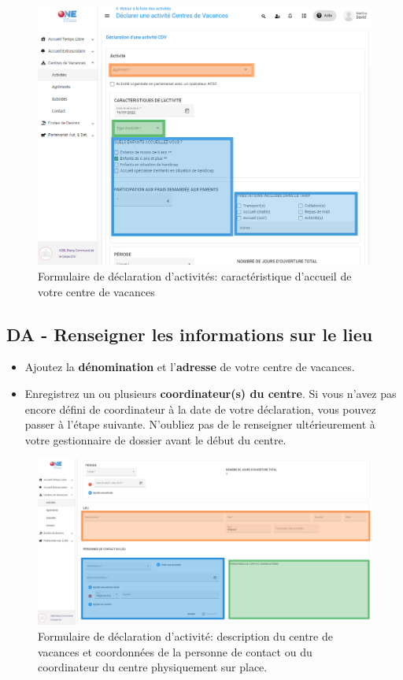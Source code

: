 \begin{figure}[ht]
    \centering
    \includegraphics[width=12cm]{Images/cdv/da-acti.png}
    \caption{Formulaire de déclaration d'activités: caractéristique d'accueil de votre centre de vacances}
    \label{fig:cdv_da}
\end{figure}


\subsection{DA - Renseigner les informations sur le lieu}
\begin{itemize}
    \item Ajoutez la \textbf{dénomination} et l'\textbf{adresse} de votre centre de vacances.
    \item Enregistrez un ou plusieurs \textbf{coordinateur(s) du centre}. Si vous n'avez pas encore défini de coordinateur à la date de votre déclaration, vous pouvez passer à l'étape suivante. N'oubliez pas de le renseigner ultérieurement à votre gestionnaire de dossier avant le début du centre. 
\end{itemize}


\begin{figure}[h]
    \centering
    \includegraphics[width=12cm]{Images/cdv/da-lieu.png}
    \caption{Formulaire de déclaration d'activité: description du centre de vacances et coordonnées de la personne de contact ou du coordinateur du centre physiquement sur place.}
    \label{fig:cdv_da2}
\end{figure}


